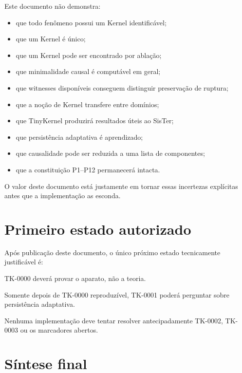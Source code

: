 \documentclass[11pt,a4paper]{article}
\begin{document}
Este documento não demonstra:

\begin{itemize}
  \item que todo fenômeno possui um Kernel identificável;
  \item que um Kernel é único;
  \item que um Kernel pode ser encontrado por ablação;
  \item que minimalidade causal é computável em geral;
  \item que witnesses disponíveis conseguem distinguir preservação de ruptura;
  \item que a noção de Kernel transfere entre domínios;
  \item que TinyKernel produzirá resultados úteis ao SisTer;
  \item que persistência adaptativa é aprendizado;
  \item que causalidade pode ser reduzida a uma lista de componentes;
  \item que a constituição P1--P12 permanecerá intacta.
\end{itemize}

O valor deste documento está justamente em tornar essas incertezas explícitas antes
que a implementação as esconda.

\section{Primeiro estado autorizado}

Após publicação deste documento, o único próximo estado tecnicamente justificável é:

\begin{center}
\end{center}

TK-0000 deverá provar o aparato, não a teoria.

Somente depois de TK-0000 reproduzível, TK-0001 poderá perguntar sobre persistência
adaptativa.

Nenhuma implementação deve tentar resolver antecipadamente TK-0002, TK-0003 ou os
marcadores abertos.

\section{Síntese final}
\end{document}
